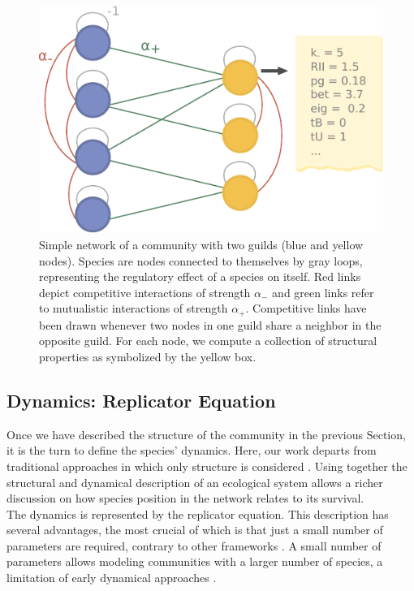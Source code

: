 \begin{figure}
    \centering
    \includegraphics{figures/chp2/fig_1.pdf}
    \caption[Simple network of a community with two guilds]{Simple network of a community with two guilds (blue and yellow nodes). Species are nodes connected to themselves by gray loops, representing the regulatory effect  of  a  species  on  itself. Red links depict competitive interactions of strength $\alpha_-$ and green links refer to mutualistic interactions of strength $\alpha_+$. Competitive links have been drawn whenever two nodes in one guild share a neighbor in the opposite guild. For each node, we compute a collection of structural properties as symbolized by the yellow box. }
    \label{chp2:fig:1}
\end{figure}

\subsection{Dynamics: Replicator Equation} \label{chp2:2.2}

Once we have described the structure of the community in the previous Section,  it is the turn to define the species' dynamics. Here, our work departs from traditional approaches in which only structure is considered \cite{Allesina2009GooglingCoextinctions,Sole2001,Morone2019TheEcosystems}. Using together the structural and dynamical description of an ecological system allows  a richer discussion on how species position in the network relates to its survival. \\

The dynamics is represented by the replicator equation. This description has several advantages, the most crucial of which is that just a small number of parameters are required, contrary to other frameworks \cite{Gouveia2021,Torres-Alruiz2013AIndexes,Medeiros2021MergingSystems}. A small number of parameters allows modeling  communities with a larger number of species, a limitation of early dynamical approaches \cite{kefi2020theoretical}.  \\

